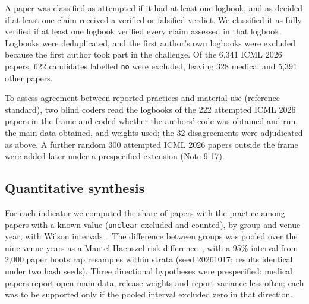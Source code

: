 \documentclass[11pt]{article}
\begin{document}
A paper was classified as attempted if it had at least one logbook, and as decided if at least one claim received a verified or falsified verdict. We classified it as fully verified if at least one logbook verified every claim assessed in that logbook. Logbooks were deduplicated, and the first author's own logbooks were excluded because the first author took part in the challenge. Of the 6,341 ICML 2026 papers, 622 candidates labelled \texttt{no} were excluded, leaving 328 medical and 5,391 other papers.

To assess agreement between reported practices and material use (reference standard), two blind coders read the logbooks of the 222 attempted ICML 2026 papers in the frame and coded whether the authors' code was obtained and run, the main data obtained, and weights used; the 32 disagreements were adjudicated as above. A further random 300 attempted ICML 2026 papers outside the frame were added later under a prespecified extension (Note 9-17).

\subsection*{Quantitative synthesis}
For each indicator we computed the share of papers with the practice among papers with a known value (\texttt{unclear} excluded and counted), by group and venue-year, with Wilson intervals~\cite{r12}. The difference between groups was pooled over the nine venue-years as a Mantel-Haenszel risk difference~\cite{r14}, with a 95\% interval from 2,000 paper bootstrap resamples within strata (seed 20261017; results identical under two hash seeds). Three directional hypotheses were prespecified: medical papers report open main data, release weights and report variance less often; each was to be supported only if the pooled interval excluded zero in that direction.
\end{document}
